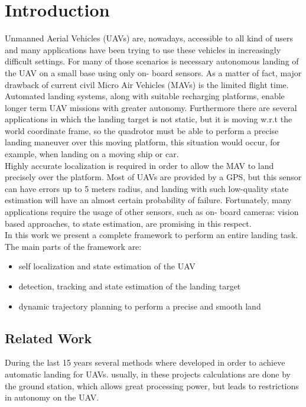 \chapter{Introduction}\label{chap:introduction}
Unmanned Aerial Vehicles (UAVs) are, nowadays, accessible to all kind of users and many applications have been trying to use these vehicles in increasingly difficult settings. For many of those scenarios is necessary autonomous landing of the UAV on a small base using only on- board sensors. As a matter of fact, major drawback of current civil Micro Air Vehicles (MAVs) is the limited flight time. Automated landing systems, along with suitable recharging platforms, enable longer term UAV missions with greater autonomy. Furthermore there are several applications in which the landing target is not static, but it is moving w.r.t the world coordinate frame, so the quadrotor must be able to perform a precise landing maneuver over this moving platform, this situation would occur, for example, when landing on a moving ship or car.\\

Highly accurate localization is required in order to allow the MAV to land precisely over the platform. Most of UAVs are provided by a GPS, but this sensor can have errors up to 5 meters radius, and landing with such low-quality state estimation will have an almost certain probability of failure. Fortunately, many applications require the usage of other sensors, such as on- board cameras: vision based approaches, to state estimation, are promising in this respect.\\

In this work we present a complete framework to perform an entire landing task. The main parts of the framework are:
\begin{itemize}
\item self localization and state estimation of the UAV
\item detection, tracking and state estimation of the landing target
\item dynamic trajectory planning to perform a precise and smooth land
\end{itemize}
\section{Related Work}\label{sec:related_work}

During the last 15 years several methods where developed in order to achieve automatic landing for UAVs.
usually, in these projects calculations are done by the ground station, which allows great processing power, but leads to restrictions in autonomy on the UAV. \\

